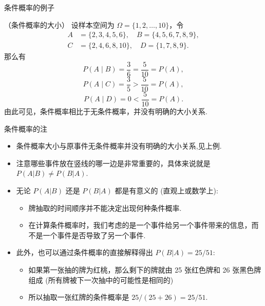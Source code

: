 \documentclass[Prob-All.tex]{subfiles}
\begin{document}
\begin{frame}{条件概率的例子}
	\begin{exam}（条件概率的大小）
设样本空间为 $\Omega=\{1,2,\ldots,10\}$，令
\begin{align*}
A&=\{2,3,4,5,6\},\quad
B=\{4,5,6,7,8,9\},\\
C&=\{2,4,6,8,10\},\quad
D=\{1,7,8,9\}.
\end{align*}
那么有
\[
P(A\mid B)=\frac{3}{6}=\frac{5}{10}=P(A),
\]
\[
P(A\mid C)=\frac{3}{5}>\frac{5}{10}=P(A),
\]
\[
P(A\mid D)=0<\frac{5}{10}=P(A).
\]
\pause 由此可见，条件概率相比于无条件概率，并没有明确的大小关系.
	\end{exam}
\end{frame}
	\begin{frame}{条件概率的注}
	\begin{itemize}[<+-|alert@+>]
	\item 条件概率大小与原事件无条件概率并没有明确的大小关系,见上例.
	\item  注意哪些事件放在竖线的哪一边是非常重要的，具体来说就是 $P (A|B)\neq P (B|A)$.
	\item 无论 $P (A|B)$ 还是 $P (B|A)$ 都是有意义的 (直观上或数学上):
	\begin{itemize}[<+-|alert@+>]
	   \item 牌抽取的时间顺序并不能决定出现何种条件概率.
	   \item 在计算条件概率时，我们考虑的是一个事件给另一个事件带来的信息，而不是一个事件是否导致了另一个事件.
	\end{itemize}

	\item  此外，也可以通过条件概率的直接解释得出 $P (B|A)=25/51$:
	\begin{itemize}[<+-|alert@+>]
		\item 如果第一张抽的牌为红桃，那么剩下的牌就由 25 张红色牌和 26 张黑色牌组成 (所有牌被下一次抽中的可能性是相同的)
		\item 所以抽取一张红牌的条件概率是 $25/(25+26)=25/51$.
	\end{itemize}
	\end{itemize}

	\end{frame}
\end{document}
